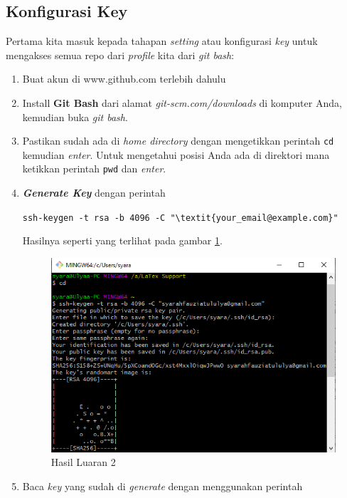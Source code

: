\subsection{Konfigurasi Key}
Pertama kita masuk kepada tahapan \textit{setting} atau konfigurasi \textit{key} untuk mengakses semua repo dari \textit{profile} kita dari \textit{git bash}:
\begin{enumerate}

\item Buat akun di www.github.com terlebih dahulu
\item Install \textbf{Git Bash} dari alamat \textit{git-scm.com/downloads} di komputer Anda, kemudian buka \textit{git bash}.
\item Pastikan sudah ada di \textit{home directory} dengan mengetikkan perintah \verb|cd| kemudian \textit{enter}. Untuk mengetahui posisi Anda ada di direktori mana ketikkan perintah \verb|pwd| dan \textit{enter}.
\item \textbf{\textit{Generate Key}} dengan perintah 

\verb|ssh-keygen -t rsa -b 4096 -C "\textit{your_email@example.com}"|

Hasilnya seperti yang terlihat pada gambar \ref{luaran1}.
\begin{figure}[!htbp]
\centerline{\includegraphics[width=.75\textwidth]{Figures/langkah1.PNG}}
\caption{Hasil Luaran 2}
\label{luaran1}
\end{figure}
\item Baca \textit{key} yang sudah di \textit{generate} dengan menggunakan perintah 


\end{enumerate}
